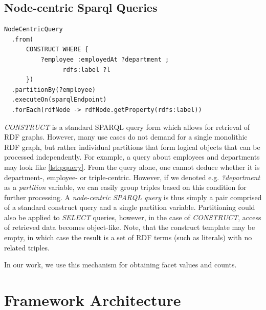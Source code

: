
\subsection{Node-centric Sparql Queries}
\begin{lstlisting}[language=sparql, label=lst:pquery, caption=Pseudo code for a node-centric query and property access]
NodeCentricQuery
  .from(
      CONSTRUCT WHERE {
          ?employee :employedAt ?department ;
                rdfs:label ?l 
      })
  .partitionBy(?employee)
  .executeOn(sparqlEndpoint)
  .forEach(rdfNode -> rdfNode.getProperty(rdfs:label))
\end{lstlisting}
\emph{CONSTRUCT} is a standard SPARQL query form which allows for retrieval of RDF graphs. However, many use cases do not demand for a single monolithic RDF graph,
but rather individual partitions that form logical objects that can be processed independently.
For example, a query about employees and departments may look like \autoref{lst:pquery}.
From the query alone, one cannot deduce whether it is department-, employee- or triple-centric.
However, if we denoted e.g. \emph{?department} as a \emph{partition} variable, we can easily group triples
based on this condition for further processing.
A \emph{node-centric SPARQL query} is thus simply a pair comprised of a standard construct query and a single partition variable.
Partitioning could also be applied to \emph{SELECT} queries, however, in the case of \emph{CONSTRUCT}, access of retrieved data becomes object-like. %
Note, that the construct template may be empty, in which case the result is a set of RDF terms (such as literals) with no related triples.

In our work, we use this mechanism for obtaining facet values and counts.

\section{Framework Architecture}
\label{sec:architecture}

